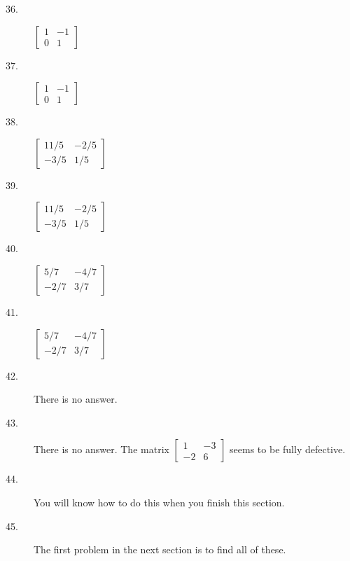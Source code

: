 \documentclass{article}
\begin{document}
\begin{description}

  \item[36.] $\begin{bmatrix} 1 & -1 \\ 0 & 1 \end{bmatrix}$

  \item[37.] $\begin{bmatrix} 1 & -1 \\ 0 & 1 \end{bmatrix}$

  \item[38.] $\begin{bmatrix} 11/5 & -2/5 \\ -3/5 & 1/5 \end{bmatrix}$

  \item[39.] $\begin{bmatrix} 11/5 & -2/5 \\ -3/5 & 1/5 \end{bmatrix}$

  \item[40.] $\begin{bmatrix} 5/7 & -4/7 \\ -2/7 & 3/7 \end{bmatrix}$

  \item[41.] $\begin{bmatrix} 5/7 & -4/7 \\ -2/7 & 3/7 \end{bmatrix}$

  \item[42.] There is no answer. 

  \item[43.] There is no answer. The matrix $\begin{bmatrix} 1 & -3 \\ -2 & 6 \end{bmatrix}$ seems to be fully defective.

  \item[44.] You will know how to do this when you finish this section.

  \item[45.] The first problem in the next section is to find all of these. 


\end{description}
\end{document}
